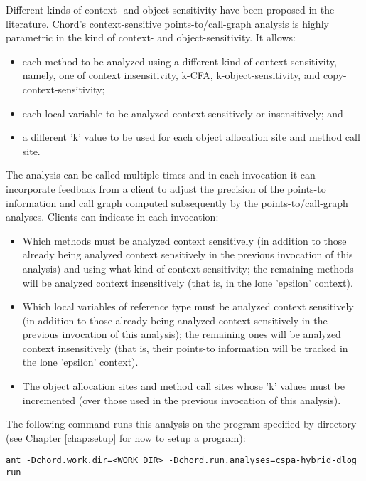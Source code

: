 Different kinds of context- and object-sensitivity have been proposed in the
literature.  Chord's context-sensitive points-to/call-graph analysis is highly
parametric in the kind of context- and object-sensitivity.  It allows:
\begin{itemize}
\item
each method to be analyzed using a different kind of context sensitivity,
namely, one of context insensitivity, k-CFA, k-object-sensitivity, and
copy-context-sensitivity;
\item
each local variable to be analyzed context sensitively or insensitively; and
\item
a different 'k' value to be used for each object allocation site and method
call site.
\end{itemize}

The analysis can be called multiple times and in each invocation it can
incorporate feedback from a client to adjust the precision of the points-to
information and call graph computed subsequently by the points-to/call-graph
analyses.  Clients can indicate in each invocation:

\begin{itemize}
\item
Which methods must be analyzed context sensitively (in addition to those already being
analyzed context sensitively in the previous invocation of this analysis) and using
what kind of context sensitivity; the remaining methods will be analyzed context
insensitively (that is, in the lone 'epsilon' context).
\item
Which local variables of reference type must be analyzed context sensitively (in
addition to those already being analyzed context sensitively in the previous
invocation of this analysis); the remaining ones will be analyzed context insensitively
(that is, their points-to information will be tracked in the lone 'epsilon' context).
\item
The object allocation sites and method call sites whose 'k' values must be incremented
(over those used in the previous invocation of this analysis).
\end{itemize}

The following command runs this analysis on the program specified
by directory  (see Chapter \ref{chap:setup} for how to setup a
program):

\begin{framed}
\begin{verbatim}
ant -Dchord.work.dir=<WORK_DIR> -Dchord.run.analyses=cspa-hybrid-dlog run
\end{verbatim}
\end{framed}

